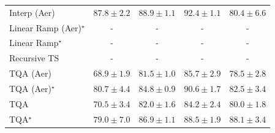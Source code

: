 \begin{tabular}{l|cccc|}
Interp (Aer) & {\cellcolor[HTML]{C34802}} \color[HTML]{F1F1F1} $87.8\pm 2.2$ & {\cellcolor[HTML]{B13F03}} \color[HTML]{F1F1F1} $88.9\pm 1.1$ & {\cellcolor[HTML]{762A05}} \color[HTML]{F1F1F1} $92.4\pm 1.1$ & {\cellcolor[HTML]{FEA332}} \color[HTML]{000000} $80.4\pm 6.6$ \\
Linear Ramp (Aer)$^\star$ & {\cellcolor[HTML]{000000}} \color[HTML]{F1F1F1} {\cellcolor{white}} \color{black} - & {\cellcolor[HTML]{000000}} \color[HTML]{F1F1F1} {\cellcolor{white}} \color{black} - & {\cellcolor[HTML]{000000}} \color[HTML]{F1F1F1} {\cellcolor{white}} \color{black} - & {\cellcolor[HTML]{000000}} \color[HTML]{F1F1F1} {\cellcolor{white}} \color{black} - \\
Linear Ramp$^\star$ & {\cellcolor[HTML]{000000}} \color[HTML]{F1F1F1} {\cellcolor{white}} \color{black} - & {\cellcolor[HTML]{000000}} \color[HTML]{F1F1F1} {\cellcolor{white}} \color{black} - & {\cellcolor[HTML]{000000}} \color[HTML]{F1F1F1} {\cellcolor{white}} \color{black} - & {\cellcolor[HTML]{000000}} \color[HTML]{F1F1F1} {\cellcolor{white}} \color{black} - \\
Recursive TS & {\cellcolor[HTML]{000000}} \color[HTML]{F1F1F1} {\cellcolor{white}} \color{black} - & {\cellcolor[HTML]{000000}} \color[HTML]{F1F1F1} {\cellcolor{white}} \color{black} - & {\cellcolor[HTML]{000000}} \color[HTML]{F1F1F1} {\cellcolor{white}} \color{black} - & {\cellcolor[HTML]{000000}} \color[HTML]{F1F1F1} {\cellcolor{white}} \color{black} - \\
TQA (Aer) & {\cellcolor[HTML]{FFFFE5}} \color[HTML]{000000} $68.9\pm 1.9$ & {\cellcolor[HTML]{FC9427}} \color[HTML]{000000} $81.5\pm 1.0$ & {\cellcolor[HTML]{DC5E0B}} \color[HTML]{F1F1F1} $85.7\pm 2.9$ & {\cellcolor[HTML]{FEBE4A}} \color[HTML]{000000} $78.5\pm 2.8$ \\
TQA (Aer)$^\star$ & {\cellcolor[HTML]{FE9F2E}} \color[HTML]{000000} $80.7\pm 4.4$ & {\cellcolor[HTML]{E56910}} \color[HTML]{F1F1F1} $84.8\pm 0.9$ & {\cellcolor[HTML]{943304}} \color[HTML]{F1F1F1} $90.6\pm 1.7$ & {\cellcolor[HTML]{F6861F}} \color[HTML]{F1F1F1} $82.5\pm 3.4$ \\
TQA & {\cellcolor[HTML]{FFFBD0}} \color[HTML]{000000} $70.5\pm 3.4$ & {\cellcolor[HTML]{F98E23}} \color[HTML]{F1F1F1} $82.0\pm 1.6$ & {\cellcolor[HTML]{EC7014}} \color[HTML]{F1F1F1} $84.2\pm 2.4$ & {\cellcolor[HTML]{FEAA38}} \color[HTML]{000000} $80.0\pm 1.8$ \\
TQA$^\star$ & {\cellcolor[HTML]{FEB744}} \color[HTML]{000000} $79.0\pm 7.0$ & {\cellcolor[HTML]{CF5004}} \color[HTML]{F1F1F1} $86.9\pm 1.1$ & {\cellcolor[HTML]{B84203}} \color[HTML]{F1F1F1} $88.5\pm 1.9$ & {\cellcolor[HTML]{BE4503}} \color[HTML]{F1F1F1} $88.1\pm 3.4$ \\

\end{tabular}
